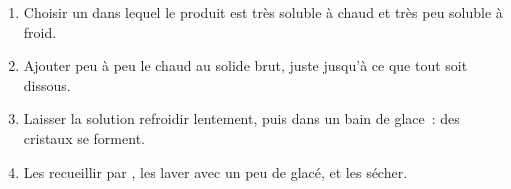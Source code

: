 \begin{method}\label{met:g10:synthesis-yield:recrystallise}
\begin{enumerate}
  \item Choisir un  dans lequel le produit est très soluble à
        chaud et très peu soluble à froid.
  \item Ajouter peu à peu le  chaud au solide brut, juste
        jusqu'à ce que tout soit dissous.
  \item Laisser la solution refroidir lentement, puis dans un bain de
        glace~: des cristaux se forment.
  \item Les recueillir par , les laver avec un peu
        de  glacé, et les sécher.
\end{enumerate}
\end{method}


